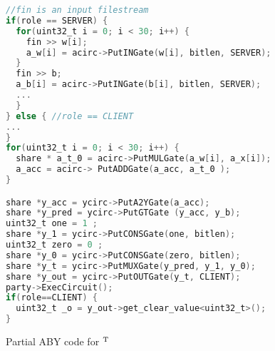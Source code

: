 \begin{figure}
\begin{lstlisting}[language=C]
//fin is an input filestream
if(role == SERVER) {
  for(uint32_t i = 0; i < 30; i++) {
    fin >> w[i];
    a_w[i] = acirc->PutINGate(w[i], bitlen, SERVER);
  }
  fin >> b;
  a_b[i] = acirc->PutINGate(b[i], bitlen, SERVER); 
  ...
  }
} else { //role == CLIENT
...
}
for(uint32_t i = 0; i < 30; i++) {
  share * a_t_0 = acirc->PutMULGate(a_w[i], a_x[i]);
  a_acc = acirc-> PutADDGate(a_acc, a_t_0 );
}

share *y_acc = ycirc->PutA2YGate(a_acc);
share *y_pred = ycirc->PutGTGate (y_acc, y_b);
uint32_t one = 1 ;
share *y_1 = ycirc->PutCONSGate(one, bitlen);
uint32_t zero = 0 ;
share *y_0 = ycirc->PutCONSGate(zero, bitlen);
share *y_t = ycirc->PutMUXGate(y_pred, y_1, y_0);
share *y_out = ycirc->PutOUTGate(y_t, CLIENT);
party->ExecCircuit();
if(role==CLIENT) {
  uint32_t _o = y_out->get_clear_value<uint32_t>();
}
\end{lstlisting}
\caption{Partial ABY code for $^{\text{\ls{T}}}$}
\label{fig:ex-aby}
\end{figure}
